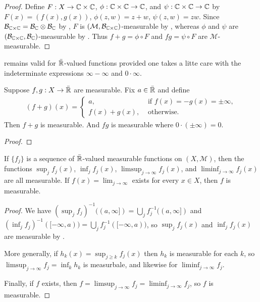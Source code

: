 \begin{proof}
    Define $F: X \to \mathbb{C} \times \mathbb{C}$, $\phi: \mathbb{C} \times \mathbb{C} \to \mathbb{C}$, and $\psi: \mathbb{C} \times \mathbb{C} \to \mathbb{C}$ by $F(x) = (f(x), g(x))$, $\phi(z, w) = z + w$, $\psi(z, w) = z w$.
    Since $\mathcal{B}_{\mathbb{C} \times \mathbb{C}} = \mathcal{B}_{\mathbb{C}} \otimes \mathcal{B}_{\mathbb{C}}$ by , $F$ is $(\mathcal{M}, \mathcal{B}_{\mathbb{C} \times \mathbb{C}})$-measurable by , whereas $\phi$ and $\psi$ are $(\mathcal{B}_{\mathbb{C} \times \mathbb{C}}, \mathcal{B}_{\mathbb{C}})$-measurable by .
    Thus $f+g = \phi \circ F$ and $fg = \psi \circ F$ are $\mathcal{M}$-measurable.
\end{proof}

 remains valid for $\bar{\mathbb{R}}$-valued functions provided one takes a litte care with the indeterminate expressions $\infty - \infty$ and $0 \cdot \infty$.

\begin{corollary}
    Suppose $f,g: X \to \bar{\mathbb{R}}$ are measurable.
    Fix $a \in \bar{\mathbb{R}}$ and define
    \begin{align}
        (f+g)(x) = \begin{cases}
            a, & \text{ if } f(x) = -g(x) = \pm \infty, \\
            f(x) + g(x), & \text{ otherwise.}
        \end{cases}
    \end{align}
    Then $f+g$ is measurable.
    And $fg$ is measurable where $0 \cdot (\pm \infty) = 0$.
\end{corollary}

\begin{proof}
    
\end{proof}

\begin{proposition}
    If $\{f_j\}$ is a sequence of $\bar{\mathbb{R}}$-valued measurable functions on $(X, \mathcal{M})$, then the functions $\sup_j f_j(x)$, $\inf_j f_j(x)$, $\limsup_{j \to \infty} f_j(x)$, and $\liminf_{j \to \infty} f_j(x)$ are all measurable.
    If $f(x) = \lim_{j \to \infty}$ exists for every $x \in X$, then $f$ is measurable.
\end{proposition}

\begin{proof}
    We have $(\sup_j f_j)^{-1}((a, \infty]) = \bigcup_{j}f_{j}^{-1}((a, \infty])$ and $(\inf_j f_j)^{-1}([-\infty, a)) = \bigcup_{j}f_{j}^{-1}([-\infty, a))$, so $\sup_j f_j(x)$ and $\inf_j f_j(x)$ are measurable by .

    More generally, if $h_k(x) = \sup_{j \ge k} f_j(x)$ then $h_k$ is measurable for each $k$, so $\limsup_{j \to \infty} f_j = \inf_k h_k$ is measurbale, and likewise for $\liminf_{j \to \infty} f_j$.

    Finally, if $f$ exists, then $f = \limsup_{j \to \infty} f_j = \liminf_{j \to \infty} f_j$, so $f$ is measurable.
\end{proof}

